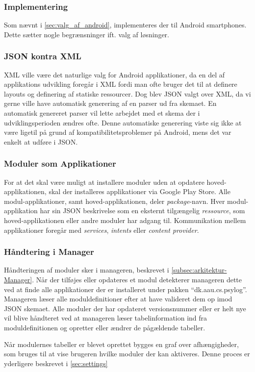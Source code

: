 \subsubsection{Implementering}
Som nævnt i \cref{sec:valg_af_android}, implementeres der til Android smartphones.
Dette sætter nogle begrænsninger ift. valg af løsninger.

\subsubsection{JSON kontra XML}
XML ville være det naturlige valg for Android applikationer, da en del af applikations udvikling foregår i XML fordi man ofte bruger det til at definere layouts og definering af statiske ressourcer. 
Dog blev JSON valgt over XML, da vi gerne ville have automatisk generering af en parser ud fra skemaet.
En automatisk genereret parser vil lette arbejdet med et skema der i udviklingsperioden ændres ofte.
Denne automatiske generering viste sig ikke at være ligetil på grund af kompatibilitetsproblemer på Android, mens det var enkelt at udføre i JSON.

\subsubsection{Moduler som Applikationer}
For at det skal være muligt at installere moduler uden at opdatere hoved-applikationen, skal der installeres applikationer via Google Play Store.
Alle modul-applikationer, samt hoved-applikationen, deler \textit{package}-navn.
Hver modul-applikation har sin JSON beskrivelse som en eksternt tilgængelig \textit{ressource}, som hoved-applikationen eller andre moduler har adgang til.
Kommunikation mellem applikationer foregår med \textit{services}, \textit{intents} eller \textit{content provider}.

\subsubsection{Håndtering i Manager}
Håndteringen af moduler sker i manageren, beskrevet i \cref{subsec:arkitektur-Manager}.
Når der tilføjes eller opdateres et modul detekterer manageren dette ved at finde alle applikationer der er installeret under pakken ``dk.aau.cs.psylog''.
Manageren læser alle moduldefinitioner efter at have valideret dem op imod JSON skemaet.
Alle moduler der har opdateret versionsnummer eller er helt nye vil blive håndteret ved at manageren læser tabelinformation ind fra moduldefinitionen og opretter eller ændrer de pågældende tabeller.

Når modulernes tabeller er blevet oprettet bygges en graf over afhængigheder, som bruges til at vise brugeren hvilke moduler der kan aktiveres.
Denne proces er yderligere beskrevet i \cref{sec:settings}

